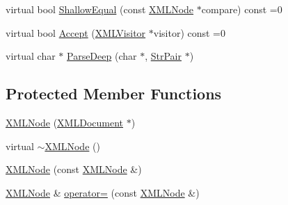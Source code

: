 \begin{DoxyCompactItemize}
\item 
virtual bool \hyperlink{classtinyxml2_1_1_x_m_l_node_a7ce18b751c3ea09eac292dca264f9226}{Shallow\+Equal} (const \hyperlink{classtinyxml2_1_1_x_m_l_node}{X\+M\+L\+Node} $\ast$compare) const =0
\item 
virtual bool \hyperlink{classtinyxml2_1_1_x_m_l_node_a81e66df0a44c67a7af17f3b77a152785}{Accept} (\hyperlink{classtinyxml2_1_1_x_m_l_visitor}{X\+M\+L\+Visitor} $\ast$visitor) const =0
\item 
virtual char $\ast$ \hyperlink{classtinyxml2_1_1_x_m_l_node_a7610d0f603e8b603d2078521811a23c1}{Parse\+Deep} (char $\ast$, \hyperlink{classtinyxml2_1_1_str_pair}{Str\+Pair} $\ast$)
\end{DoxyCompactItemize}
\subsection*{Protected Member Functions}
\begin{DoxyCompactItemize}
\item 
\hyperlink{classtinyxml2_1_1_x_m_l_node_a29868df6ca383d574f584dfdd15105b6}{X\+M\+L\+Node} (\hyperlink{classtinyxml2_1_1_x_m_l_document}{X\+M\+L\+Document} $\ast$)
\item 
virtual \hyperlink{classtinyxml2_1_1_x_m_l_node_a8f41e898cdd4da4cdbb7f05b0c7d9f69}{$\sim$\+X\+M\+L\+Node} ()
\item 
\hyperlink{classtinyxml2_1_1_x_m_l_node_a78be01384518a969da905548f318d75b}{X\+M\+L\+Node} (const \hyperlink{classtinyxml2_1_1_x_m_l_node}{X\+M\+L\+Node} \&)
\item 
\hyperlink{classtinyxml2_1_1_x_m_l_node}{X\+M\+L\+Node} \& \hyperlink{classtinyxml2_1_1_x_m_l_node_ade79231d908e1f21862819e00e56ab6e}{operator=} (const \hyperlink{classtinyxml2_1_1_x_m_l_node}{X\+M\+L\+Node} \&)
\end{DoxyCompactItemize}
